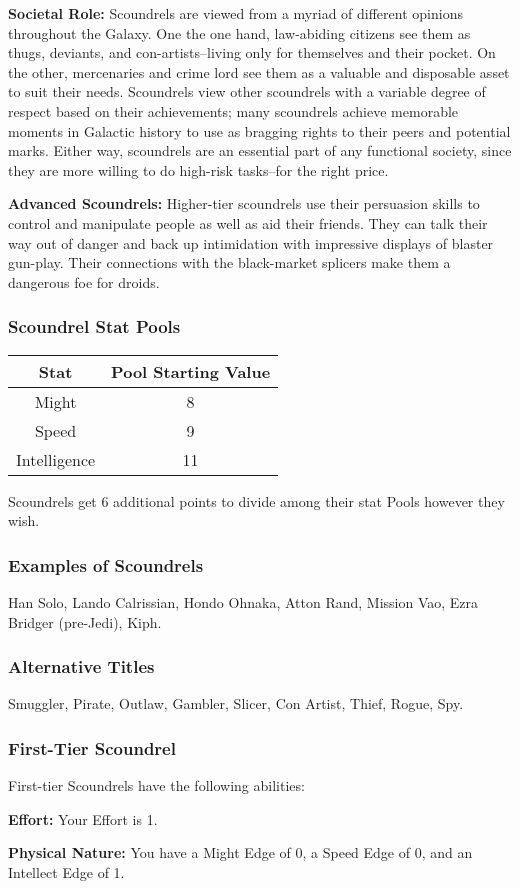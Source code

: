 \documentclass[a4paper,10pt,final,twocolumn,oneside]{book}
\newcommand{\statPool}[5]
{
	\subsubsection*{#1 Stat Pools}
	\label{subsub:#1StatPools}
	\begin{center}
	\begin{tabular}{ |c|c| }
	\hline
	\textbf{Stat} & \textbf{Pool Starting Value} \\
	\hline \hline
	Might & #2 \\
	\hline
 	Speed & #3  \\
 	\hline
 	Intelligence & #4  \\
 	\hline
	\end{tabular}
	\end{center}
	#1s get #5 additional points to divide among their stat Pools however they wish.
}
\newcommand{\itemLine}[2]{\textbf{#1:}{ #2}\par}
\begin{document}
\itemLine{Societal Role}{Scoundrels are viewed from a myriad of different opinions throughout the Galaxy. One the one hand, law-abiding citizens see them as thugs, deviants, and con-artists--living only for themselves and their pocket. On the other, mercenaries and crime lord see them as a valuable and disposable asset to suit their needs. Scoundrels view other scoundrels with a variable degree of respect based on their achievements; many scoundrels achieve memorable moments in Galactic history to use as bragging rights to their peers and potential marks. Either way, scoundrels are an essential part of any functional society, since they are more willing to do high-risk tasks--for the right price.}

\itemLine{Advanced Scoundrels}{Higher-tier scoundrels use their persuasion skills to control and manipulate people as well as aid their friends. They can talk their way out of danger and back up intimidation with impressive displays of blaster gun-play. Their connections with the black-market splicers make them a dangerous foe for droids.}

\statPool{Scoundrel}{8}{9}{11}{6}

\subsubsection*{Examples of Scoundrels}
\label{subsub:scoundrelExamples}

Han Solo, Lando Calrissian, Hondo Ohnaka, Atton Rand, Mission Vao, Ezra Bridger (pre-Jedi), Kiph.

\subsubsection*{Alternative Titles}
\label{subsub:scoundrelAlternative}

Smuggler, Pirate, Outlaw, Gambler, Slicer, Con Artist, Thief, Rogue, Spy.


\subsubsection*{First-Tier Scoundrel}
\label{subsub:scoundrelFirstTier}

First-tier Scoundrels have the following abilities:

\itemLine{Effort}{Your Effort is 1.}

\itemLine{Physical Nature}{You have a Might Edge of 0, a Speed Edge of 0, and an Intellect Edge of 1.}
\end{document}
